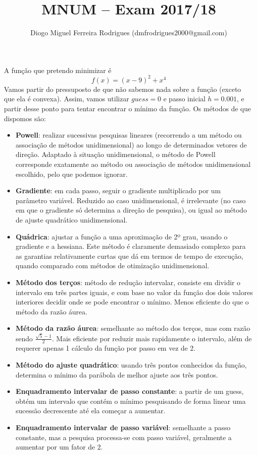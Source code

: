 \documentclass{mnum}
\title{MNUM -- Exam 2017/18}
\author{Diogo Miguel Ferreira Rodrigues (dmfrodrigues2000@gmail.com)}
\begin{document}
\setcounter{chapter}{16}

A função que pretendo minimizar é
\begin{equation*}
    f(x)=(x-9)^2+x^4
\end{equation*}
Vamos partir do pressuposto de que não sabemos nada sobre a função (exceto que ela é convexa). Assim, vamos utilizar $guess=0$ e passo inicial $h=0.001$, e partir desse ponto para tentar encontrar o mínimo da função.
Os métodos de que dispomos são:
\begin{itemize}
    \item \textbf{Powell}: realizar sucessivas pesquisas lineares (recorrendo a um método ou associação de métodos unidimensional) ao longo de determinados vetores de direção. Adaptado à situação unidimensional, o método de Powell corresponde exatamente ao método ou associação de métodos unidimensional escolhido, pelo que podemos ignorar.
    \item \textbf{Gradiente}: em cada passo, seguir o gradiente multiplicado por um parâmetro variável. Reduzido ao caso unidimensional, é irrelevante (no caso em que o gradiente só determina a direção de pesquisa), ou igual ao método de ajuste quadrático unidimensional.
    \item \textbf{Quádrica}: ajustar a função a uma aproximação de 2º grau, usando o gradiente e a hessiana. Este método é claramente demasiado complexo para as garantias relativamente curtas que dá em termos de tempo de execução, quando comparado com métodos de otimização unidimensional.
    \item \textbf{Método dos terços}: método de redução intervalar, consiste em dividir o intervalo em três partes iguais, e com base no valor da função dos dois valores interiores decidir onde se pode encontrar o mínimo. Menos eficiente do que o método da razão áurea.
    \item \textbf{Método da razão áurea}: semelhante ao método dos terços, mas com razão sendo $\frac{\sqrt{5}-1}{2}$. Mais eficiente por reduzir mais rapidamente o intervalo, além de requerer apenas 1 cálculo da função por passo em vez de 2.
    \item \textbf{Método do ajuste quadrático}: usando três pontos conhecidos da função, determina o mínimo da parábola de melhor ajuste aos três pontos.
    \item \textbf{Enquadramento intervalar de passo constante}: a partir de um guess, obtém um intervalo que contém o mínimo pesquisando de forma linear uma sucessão decrescente até ela começar a aumentar.
    \item \textbf{Enquadramento intervalar de passo variável}: semelhante a passo constante, mas a pesquisa processa-se com passo variável, geralmente a aumentar por um fator de 2.
\end{itemize}
\end{document}
